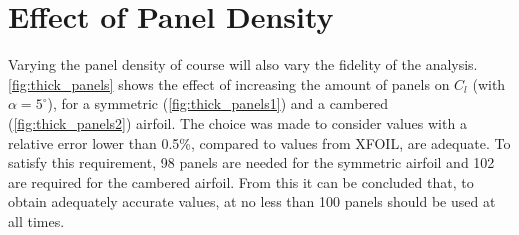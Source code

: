 \section{Effect of Panel Density}
\label{sec:panels}
Varying the panel density of course will also vary the fidelity of the analysis.
\autoref{fig:thick_panels} shows the effect of increasing the amount of panels
on $C_l$ (with $\alpha = 5^{\circ}$), for a symmetric (\autoref{fig:thick_panels1}) and a cambered
(\autoref{fig:thick_panels2}) airfoil. The choice was made to consider values
with a relative error lower than 0.5\%, compared to values from XFOIL, are
adequate. To satisfy this requirement, 98 panels are needed for the symmetric
airfoil and 102 are required for the cambered airfoil. From this it can be
concluded that, to obtain adequately accurate values, at no less than 100 panels
should be used at all times.

